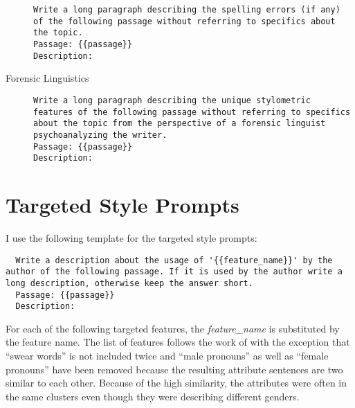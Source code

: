 \begin{description}
        \begin{minipage}{\linewidth}
          \begin{lstlisting}
Write a long paragraph describing the spelling errors (if any) of the following passage without referring to specifics about the topic.
Passage: {{passage}}
Description:
\end{lstlisting}
        \end{minipage}
  \item[Forensic Linguistics]\leavevmode \newline
        \begin{minipage}{\linewidth}
          \begin{lstlisting}
Write a long paragraph describing the unique stylometric features of the following passage without referring to specifics about the topic from the perspective of a forensic linguist psychoanalyzing the writer.
Passage: {{passage}}
Description:
\end{lstlisting}
        \end{minipage}
\end{description}

\section{Targeted Style Prompts}
\label{sec:appendix:targetPrompts}

I use the following template for the targeted style prompts:
\begin{lstlisting}
  Write a description about the usage of '{{feature_name}}' by the author of the following passage. If it is used by the author write a long description, otherwise keep the answer short.
  Passage: {{passage}}
  Description:
\end{lstlisting}

For each of the following targeted features, the \textit{feature\_name} is substituted by the feature name. The list of features follows the work of \citet{patelLearningInterpretableStyle2023} with the exception that \enquote{swear words} is not included twice and \enquote{male pronouns} as well as \enquote{female pronouns} have been removed because the resulting attribute sentences are two similar to each other. Because of the high similarity, the attributes were often in the same clusters even though they were describing different genders.

